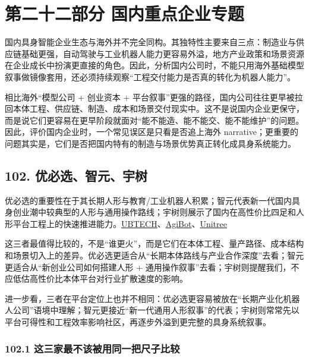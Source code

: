
\part*{第二十二部分 国内重点企业专题}

国内具身智能企业生态与海外并不完全同构。其独特性主要来自三点：制造业与供应链基础更强，自动驾驶与工业机器人能力更容易外溢，地方产业政策和场景资源在企业成长中扮演更直接的角色。因此，分析国内公司时，不能只用海外基础模型叙事做镜像套用，还必须持续观察“工程交付能力是否真的转化为机器人能力”。

相比海外“模型公司 + 创业资本 + 平台叙事”更强的路径，国内公司往往更早被拉回本体工程、供应链、制造、成本和场景交付现实中。这不是说国内企业更保守，而是说它们更容易在更早阶段就面对“能不能造、能不能交、能不能维护”的问题。因此，评价国内企业时，一个常见误区是只看是否追上海外 narrative；更重要的问题其实是，它们是否把国内特有的制造与场景优势真正转化成具身系统能力。

\chapter*{102. 优必选、智元、宇树}

优必选的重要性在于其长期人形与教育/工业机器人积累；智元代表新一代国内具身创业潮中较典型的人形与通用操作路线；宇树则展示了国内在高性价比四足和人形平台工程上的快速推进能力。\href{https://www.ubtrobot.com/}{UBTECH}、\href{https://www.agibot.com/}{AgiBot}、\href{https://www.unitree.com/}{Unitree}

这三者最值得比较的，不是“谁更火”，而是它们在本体工程、量产路径、成本结构和场景切入上的差异。优必选更适合从“长期本体路线与产业合作深度”去看；智元更适合从“新创业公司如何搭建人形 + 通用操作叙事”去看；宇树则提醒我们，不应低估高性价比本体平台对行业扩散速度的影响。

进一步看，三者在平台定位上也并不相同：优必选更容易被放在“长期产业化机器人公司”语境中理解；智元更接近“新一代通用人形叙事”的代表；宇树则常常先以平台可得性和工程效率影响社区，再逐步外溢到更完整的具身系统叙事。

\section*{102.1 这三家最不该被用同一把尺子比较}


